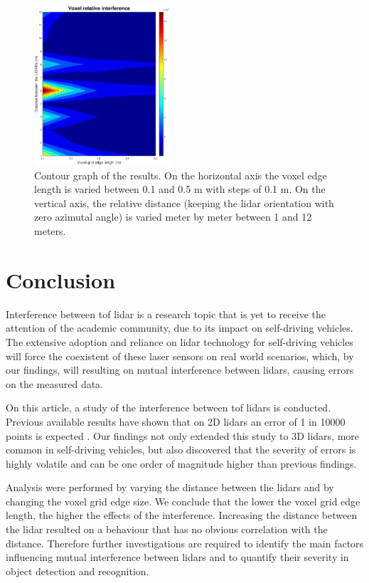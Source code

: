 \documentclass[extendedabs]{recpad2k}
\begin{document}
\begin{figure}
    \centering
    \includegraphics[width=0.45\textwidth]{images/contour.eps}
    \caption{Contour graph of the results. On the horizontal axis the voxel edge length is varied between 0.1 and 0.5 m with steps of 0.1 m. On the vertical axis, the relative distance (keeping the \gls{lidar} orientation with zero azimutal angle) is varied meter by meter between 1 and 12 meters.}
    \label{fig:results}
\end{figure}

\section{Conclusion}
Interference between \gls{tof} \gls{lidar} is a research topic that is yet to receive the attention of the academic community, due to its impact on self-driving vehicles. The extensive adoption and reliance on \gls{lidar} technology for self-driving vehicles will force the coexistent of these laser sensors on real world scenarios, which, by our findings, will resulting on mutual interference between \gls{lidar}s, causing errors on the measured data.

On this article, a study of the interference between \gls{tof} \gls{lidar}s is conducted. Previous available results have shown that on 2D \gls{lidar}s an error of 1 in 10000 points is expected \cite{Kim2017, Kim2015}. Our findings not only extended this study to 3D \gls{lidar}s, more common in self-driving vehicles, but also discovered that the severity of errors is highly volatile and can be one order of magnitude higher than previous findings.

Analysis were performed by varying the distance between the \gls{lidar}s and by changing the voxel grid edge size. We conclude that the lower the voxel grid edge length, the higher the effects of the interference. Increasing the distance between the \gls{lidar} resulted on a behaviour that has no obvious correlation with the distance. Therefore further investigations are required to identify the main factors influencing mutual interference between \gls{lidar}s and to quantify their severity in object detection and recognition.


\footnotesize

\end{document}
